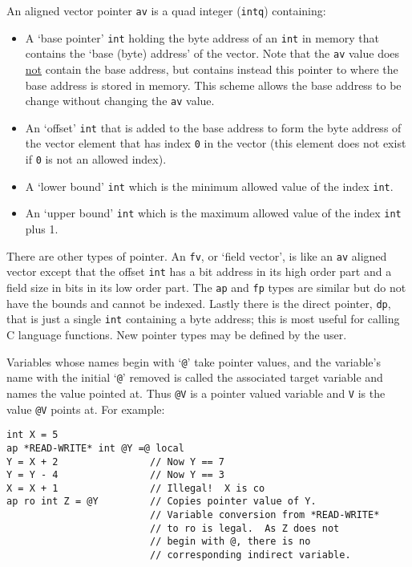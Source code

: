 \documentclass[12pt]{article}
\newenvironment{indpar}[1][0.3in]%
	{\begin{list}{}%
		     {\setlength{\itemsep}{0in}%
		      \setlength{\topsep}{0in}%
		      \setlength{\parsep}{1ex}%
		      \setlength{\labelwidth}{#1}%
		      \setlength{\leftmargin}{#1}%
		      \addtolength{\leftmargin}{\labelsep}}%
	 \item}%
	{\end{list}}
\begin{document}
An aligned vector pointer {\tt av} is a
quad integer ({\tt intq}) containing:
\begin{itemize}
\item A `base pointer' {\tt int} holding the byte address
of an {\tt int} in memory
that contains the `base (byte) address' of the vector.
Note that the {\tt av} value does \underline{not} contain
the base address, but contains instead this pointer to where
the base address is stored in memory.  This scheme allows
the base address to be change without changing the {\tt av} value.
\item An `offset' {\tt int} that is added to the base address
to form the byte address of the vector element
that has index {\tt 0} in the vector (this element does not
exist if {\tt 0} is not an allowed index).
\item A `lower bound' {\tt int} which is the minimum allowed
value of the index {\tt int}.
\item An `upper bound' {\tt int} which is the maximum allowed
value of the index {\tt int} plus 1.
\end{itemize}

There are other types of pointer.  An {\tt fv}, or `field vector',
is like an {\tt av} aligned
vector except that the offset {\tt int} has a bit address in its
high order part and a field size in bits in its low order part.
The {\tt ap} and {\tt fp} types are
similar but do not have the bounds and cannot be indexed.  Lastly
there is the direct pointer, {\tt dp}, that is just a single {\tt int}
containing a byte address; this is most useful for calling
C language functions.
New pointer types may be defined by the user.

Variables whose names begin with `{\tt @}' take pointer values, and
the variable's name with the
initial `{\tt @}' removed is called the associated
target variable and names the value pointed at.
Thus {\tt @V} is a pointer valued variable and {\tt V} is the value
{\tt @V} points at.
For example:

\begin{indpar}\begin{verbatim}
int X = 5
ap *READ-WRITE* int @Y =@ local
Y = X + 2                // Now Y == 7
Y = Y - 4                // Now Y == 3
X = X + 1                // Illegal!  X is co
ap ro int Z = @Y         // Copies pointer value of Y.
                         // Variable conversion from *READ-WRITE*
                         // to ro is legal.  As Z does not
                         // begin with @, there is no
                         // corresponding indirect variable.
\end{verbatim}\end{indpar}
\end{document}
